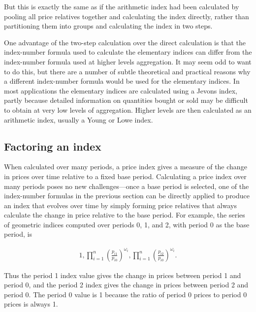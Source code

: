 \documentclass[]{article}
\begin{document}
But this is exactly the same as if the arithmetic index had been calculated by pooling all price relatives together and calculating the index directly, rather than partitioning them into groups and calculating the index in two steps.

One advantage of the two-step calculation over the direct calculation is that the index-number formula used to calculate the elementary indices can differ from the index-number formula used at higher levels aggregation. It may seem odd to want to do this, but there are a number of subtle theoretical and practical reasons why a different index-number formula would be used for the elementary indices. In most applications the elementary indices are calculated using a Jevons index, partly because detailed information on quantities bought or sold may be difficult to obtain at very low levels of aggregation. Higher levels are then calculated as an arithmetic index, usually a Young or Lowe index.

\hypertarget{factoring-an-index}{%
\subsection{Factoring an index}\label{factoring-an-index}}

When calculated over many periods, a price index gives a measure of the change in prices over time relative to a fixed base period. Calculating a price index over many periods poses no new challenges---once a base period is selected, one of the index-number formulas in the previous section can be directly applied to produce an index that evolves over time by simply forming price relatives that always calculate the change in price relative to the base period. For example, the series of geometric indices computed over periods 0, 1, and 2, with period 0 as the base period, is

\begin{align*}
1, \prod_{i = 1}^{n} \left(\frac{p_{i1}}{p_{i0}}\right)^{\omega_{i}}, \prod_{i = 1}^{n} \left(\frac{p_{i2}}{p_{i0}}\right)^{\omega_{i}}.
\end{align*}

Thus the period 1 index value gives the change in prices between period 1 and period 0, and the period 2 index gives the change in prices between period 2 and period 0. The period 0 value is 1 because the ratio of period 0 prices to period 0 prices is always 1.
\end{document}
